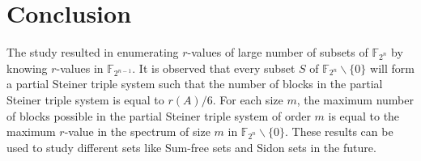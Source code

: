 \documentclass[12pt,a4paper]{article}
\begin{document}
	\section{Conclusion}
	The study resulted in enumerating $r$-values of large number of subsets of $\mathbb{F}_{2^n}$ by knowing $r$-values in $\mathbb{F}_{2^{n-1}}$. It is observed that every subset $S$ of $\mathbb{F}_{2^n}\backslash\{0\}$ will form a partial Steiner triple system such that the number of blocks in the partial Steiner triple system is equal to $r(A)/6$. For each size $m$, the maximum number of blocks possible in the partial Steiner triple system of order $m$ is equal to the maximum $r$-value in the spectrum of size $m$ in $\mathbb{F}_{2^n}\backslash\{0\}$. These results can be used to study different sets like Sum-free sets and Sidon sets in the future.
		\newpage
        
\end{document}
